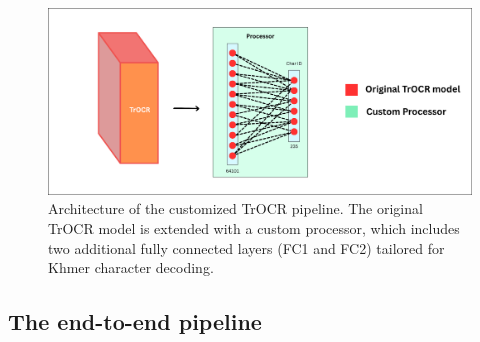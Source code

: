 \begin{figure}[H]
    \centering
    \includegraphics[width=\textwidth]{figures/Customize_processor.png}
    \caption{Architecture of the customized TrOCR pipeline. 
    The original TrOCR model is extended with a custom processor, 
    which includes two additional fully connected layers 
    (FC1 and FC2) tailored for Khmer character decoding.}
    \label{fig:trocr-custom-processor}
\end{figure}



\subsection{The end-to-end pipeline}
\label{subsec:khmer-ocr-pipeline}

